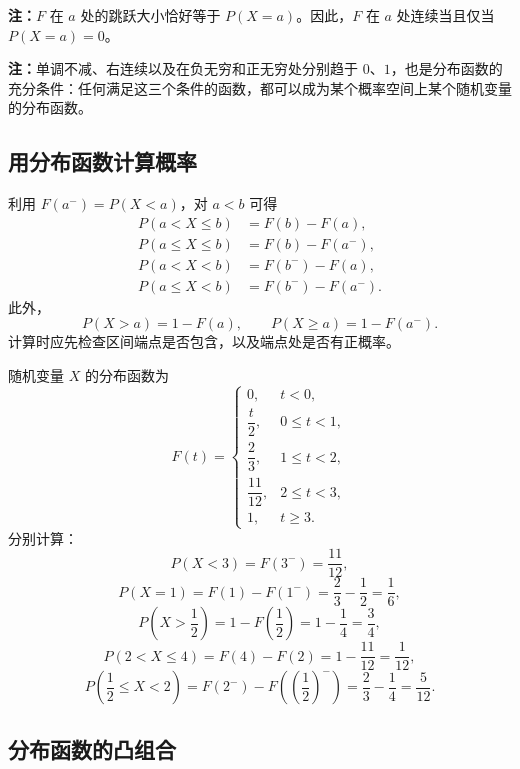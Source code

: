 \textbf{注：}\quad $F$ 在 $a$ 处的跳跃大小恰好等于 $P(X=a)$。因此，$F$ 在 $a$ 处连续当且仅当 $P(X=a)=0$。

\textbf{注：}\quad 单调不减、右连续以及在负无穷和正无穷处分别趋于 $0$、$1$，也是分布函数的充分条件：任何满足这三个条件的函数，都可以成为某个概率空间上某个随机变量的分布函数。

\subsection*{用分布函数计算概率}

利用 $F(a^-)=P(X<a)$，对 $a<b$ 可得
\[
\begin{aligned}
P(a<X\leq b)&=F(b)-F(a),\\
P(a\leq X\leq b)&=F(b)-F(a^-),\\
P(a<X<b)&=F(b^-)-F(a),\\
P(a\leq X<b)&=F(b^-)-F(a^-).
\end{aligned}
\]
此外，
\[
P(X>a)=1-F(a),
\qquad
P(X\geq a)=1-F(a^-).
\]
计算时应先检查区间端点是否包含，以及端点处是否有正概率。

\begin{example}[含跳跃的分布函数]
随机变量 $X$ 的分布函数为
\[
F(t)=
\begin{cases}
0,&t<0,\\[0.3em]
\dfrac t2,&0\leq t<1,\\[0.5em]
\dfrac23,&1\leq t<2,\\[0.5em]
\dfrac{11}{12},&2\leq t<3,\\[0.5em]
1,&t\geq3.
\end{cases}
\]
分别计算：
\[
P(X<3)=F(3^-)=\frac{11}{12},
\]
\[
P(X=1)=F(1)-F(1^-)=\frac23-\frac12=\frac16,
\]
\[
P\left(X>\frac12\right)=1-F\left(\frac12\right)
=1-\frac14=\frac34,
\]
\[
P(2<X\leq4)=F(4)-F(2)=1-\frac{11}{12}=\frac1{12},
\]
\[
P\left(\frac12\leq X<2\right)
=F(2^-)-F\left(\left(\frac12\right)^-\right)
=\frac23-\frac14=\frac5{12}.
\]
\end{example}

\subsection*{分布函数的凸组合}

